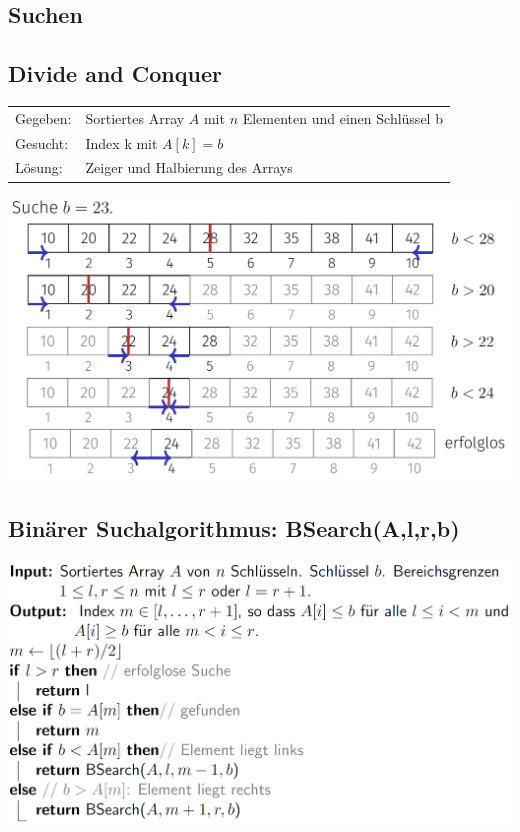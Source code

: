 \vspace{-4pt}
\begin{sectionbox}
\section{Suchen}
\subsection{Divide and Conquer}\smallskip
\begin{tabular*}{\columnwidth}{@{\extracolsep\fill}ll@{}}
Gegeben: & Sortiertes Array $A$ mit $n$ Elementen und einen Schlüssel b \\
Gesucht: & Index k mit $A[k]=b$ \\
Lösung: & Zeiger und Halbierung des Arrays\\
\end{tabular*}

\begin{center}
    \includegraphics[width = 0.6\columnwidth]{../img/DaQ.png}
\end{center}\par\smallskip
\end{sectionbox}
\vspace{-4pt}
\begin{sectionbox}
\subsection{Binärer Suchalgorithmus: BSearch(A,l,r,b)}\smallskip
\begin{center}
    \includegraphics[width = \columnwidth]{../img/BSearch.png}
\end{center}\par\smallskip
\end{sectionbox}